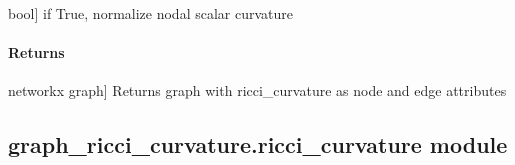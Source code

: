 \documentclass[letterpaper,10pt,english]{sphinxmanual}
\begin{document}
\begin{fulllineitems}
\begin{fulllineitems}
\begin{description}
\sphinxlineitem{norm}{[}bool{]}
\sphinxAtStartPar
if True, normalize nodal scalar curvature

\end{description}


\paragraph{Returns}
\label{\detokenize{graph_ricci_curvature:id4}}\begin{description}
\sphinxlineitem{self.G}{[}networkx graph{]}
\sphinxAtStartPar
Returns graph with ricci\_curvature as node and edge attributes

\end{description}

\end{fulllineitems}


\end{fulllineitems}



\subsection{graph\_ricci\_curvature.ricci\_curvature module}
\label{\detokenize{graph_ricci_curvature:module-graph_ricci_curvature.ricci_curvature}}\label{\detokenize{graph_ricci_curvature:graph-ricci-curvature-ricci-curvature-module}}
\end{document}
